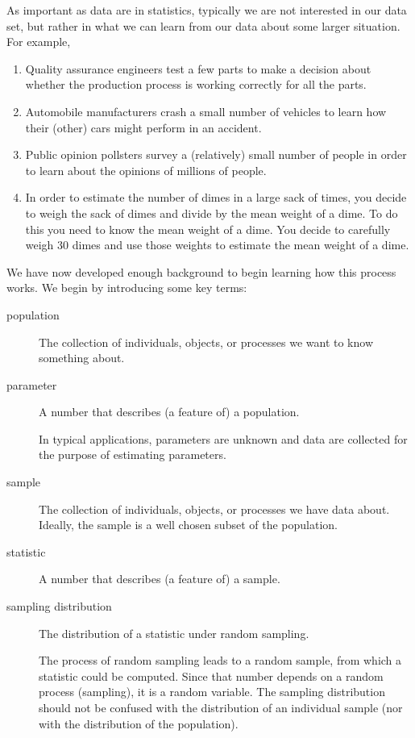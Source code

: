 \documentclass[twoside]{book}\usepackage[]{graphicx}\usepackage[]{xcolor}
\newcounter{example}[section]
\begin{document}
As important as data are in statistics, typically we are not interested in our 
data set, but rather in what we can learn from our data about some larger situation.
For example,
\begin{enumerate}
	\item
		Quality assurance engineers test a few parts to make a decision about 
		whether the production process is working correctly for all the parts.  
	\item 
	Automobile manufacturers crash a small number of vehicles to learn how
	their (other) cars might perform in an accident.  
\item 
	Public opinion pollsters survey a (relatively) small number of people in order to learn
about the opinions of millions of people.
\item
	In order to estimate the number of dimes in a large sack of times, you decide to
	weigh the sack of dimes and divide by the mean weight of a dime.  To do this you
	need to know the mean weight of a dime.  You decide to carefully weigh 30 dimes
	and use those weights to estimate the mean weight of a dime.
\end{enumerate}

We have now developed enough background to begin learning how this process works. 
We begin by introducing some key terms:
\begin{description}
	\item[population] The collection of individuals, objects, or processes we want to 
		know something about.

	\item[parameter] A number that describes (a feature of) a population.

		In typical applications, parameters are unknown and data are collected
		for the purpose of estimating parameters.

	\item[sample] The collection of individuals, objects, or processes we have data
		about.  Ideally, the sample is a well chosen subset of the population.

	\item[statistic] A number that describes (a feature of) a sample.

	\item[sampling distribution] The distribution of a statistic under random sampling.

		The process of random sampling leads to a random sample, from which a statistic
		could be computed.  Since that number depends on a random process (sampling),
		it is a random variable.  The sampling distribution should not be confused
		with the distribution of an individual sample (nor with the distribution of 
		the population).

\end{description}
\end{document}
